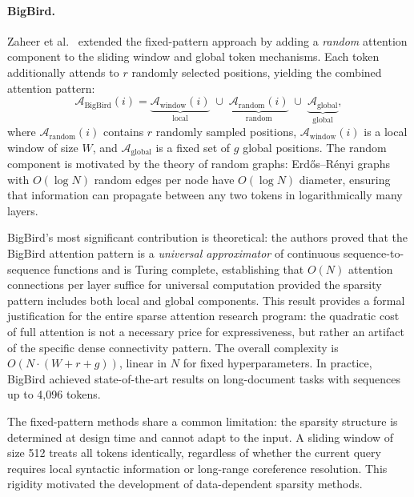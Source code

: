 \paragraph{BigBird.}
Zaheer et al.~\cite{zaheer2020big} extended the fixed-pattern approach by adding a \emph{random} attention component to the sliding window and global token mechanisms. Each token additionally attends to $r$ randomly selected positions, yielding the combined attention pattern:
\begin{equation}
\mathcal{A}_{\text{BigBird}}(i) = \underbrace{\mathcal{A}_{\text{window}}(i)}_{\text{local}} \;\cup\; \underbrace{\mathcal{A}_{\text{random}}(i)}_{\text{random}} \;\cup\; \underbrace{\mathcal{A}_{\text{global}}}_{\text{global}},
\label{eq:bigbird}
\end{equation}
where $\mathcal{A}_{\text{random}}(i)$ contains $r$ randomly sampled positions, $\mathcal{A}_{\text{window}}(i)$ is a local window of size $W$, and $\mathcal{A}_{\text{global}}$ is a fixed set of $g$ global positions. The random component is motivated by the theory of random graphs: Erd\H{o}s--R\'{e}nyi graphs with $O(\log N)$ random edges per node have $O(\log N)$ diameter, ensuring that information can propagate between any two tokens in logarithmically many layers.

BigBird's most significant contribution is theoretical: the authors proved that the BigBird attention pattern is a \emph{universal approximator} of continuous sequence-to-sequence functions and is Turing complete, establishing that $O(N)$ attention connections per layer suffice for universal computation provided the sparsity pattern includes both local and global components. This result provides a formal justification for the entire sparse attention research program: the quadratic cost of full attention is not a necessary price for expressiveness, but rather an artifact of the specific dense connectivity pattern. The overall complexity is $O(N \cdot (W + r + g))$, linear in $N$ for fixed hyperparameters. In practice, BigBird achieved state-of-the-art results on long-document tasks with sequences up to 4,096 tokens.

The fixed-pattern methods share a common limitation: the sparsity structure is determined at design time and cannot adapt to the input. A sliding window of size 512 treats all tokens identically, regardless of whether the current query requires local syntactic information or long-range coreference resolution. This rigidity motivated the development of data-dependent sparsity methods.


